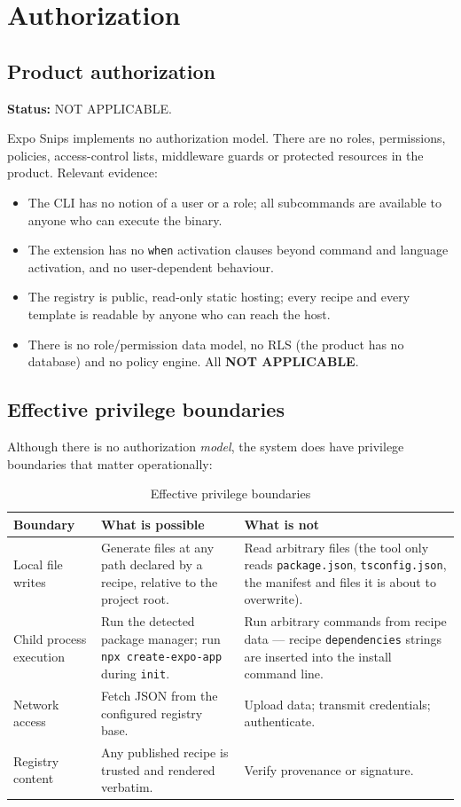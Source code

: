 \chapter{Authorization}
\label{ch:authorization}

\section{Product authorization}

\textbf{Status:} NOT APPLICABLE.

Expo Snips implements no authorization model. There are no roles, permissions,
policies, access-control lists, middleware guards or protected resources in the
product. Relevant evidence:

\begin{itemize}
  \item The CLI has no notion of a user or a role; all subcommands are available to
        anyone who can execute the binary.
  \item The extension has no \texttt{when} activation clauses beyond command and
        language activation, and no user-dependent behaviour.
  \item The registry is public, read-only static hosting; every recipe and every
        template is readable by anyone who can reach the host.
  \item There is no role/permission data model, no RLS (the product has no
        database) and no policy engine. All \textbf{NOT APPLICABLE}.
\end{itemize}

\section{Effective privilege boundaries}

Although there is no authorization \emph{model}, the system does have privilege
boundaries that matter operationally:

\begin{longtable}{p{4.4cm}p{5.4cm}p{4.6cm}}
\caption{Effective privilege boundaries}\\
\toprule
\textbf{Boundary} & \textbf{What is possible} & \textbf{What is not} \\
\midrule

Local file writes & Generate files at any path declared by a recipe, relative to the
project root. & Read arbitrary files (the tool only reads \texttt{package.json},
\texttt{tsconfig.json}, the manifest and files it is about to overwrite). \\
Child process execution & Run the detected package manager; run \texttt{npx
create-expo-app} during \texttt{init}. & Run arbitrary commands from recipe data ---
recipe \texttt{dependencies} strings are inserted into the install command line. \\
Network access & Fetch JSON from the configured registry base. & Upload data;
transmit credentials; authenticate. \\
Registry content & Any published recipe is trusted and rendered verbatim. & Verify
provenance or signature. \\
\bottomrule
\end{longtable}

